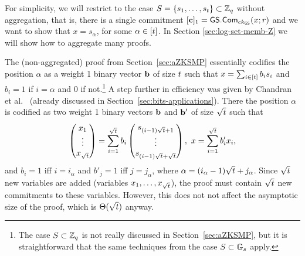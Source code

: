 For simplicity, we will restrict to the case \(S=\{s_1,\ldots,s_t \}\subset\mathbb{Z}_q\) without aggregation, that is, there is a single commitment \([\mathbf{c}]_1={\mathsf{GS}}.\mathsf{Com}_{ck_{\mathsf{GS}}}(x;r)\) and we want to show that \(x=s_\alpha\), for some \(\alpha\in[t ]\). In Section \ref{sec:log-set-memb-Z} we will show how to aggregate many proofs.

The (non-aggregated) proof from Section~\ref{sec:aZKSMP} essentially codifies the position \(\alpha\) as a weight 1 binary vector \(\mathbf{b}\) of size \(t \) such that \(x=\sum_{i\in[t ]}b_is_i\) and
\(b_i=1\) if \(i=\alpha\) and \(0\) if not.\footnote{The case \(S\subset\mathbb{Z}_q\) is not really discussed in Section~\ref{sec:aZKSMP}, but it is straightforward that the same techniques from the case \(S\subset\mathbb{G}_s\) apply.} A step further in efficiency was given by Chandran et al.~\cite{ICALP:ChaGroSah07} (already discussed in Section~\ref{sec:bits-applications}). There the position \(\alpha\) is codified as two weight 1 binary vectors \(\mathbf{b}\) and \(\mathbf{b}'\) of size \(\sqrt{t }\) such that
\[
\begin{pmatrix}
x_1\\\vdots\\x_{\sqrt{t }}
\end{pmatrix}
=\sum_{i=1}^{\sqrt{t }}b_i
\begin{pmatrix}
s_{(i-1)\sqrt{t }+1}\\\vdots\\s_{(i-1)\sqrt{t }+\sqrt{t }}
\end{pmatrix},
\text{ } x=\sum_{i=1}^{\sqrt{t }}b'_ix_i,\]
and \(b_i=1\) iff \(i=i_\alpha\) and \(b'_j=1\) iff \(j=j_\alpha\), where \(\alpha=(i_\alpha-1)\sqrt{t }+j_\alpha\). Since \(\sqrt{t }\) new variables are added (variables \(x_1,\ldots,x_{\sqrt{t }}\)), the proof must contain \(\sqrt{t }\) new commitments to these variables. However, this does not not affect the asymptotic size of the proof, which is \(\Theta(\sqrt{t })\) anyway.


